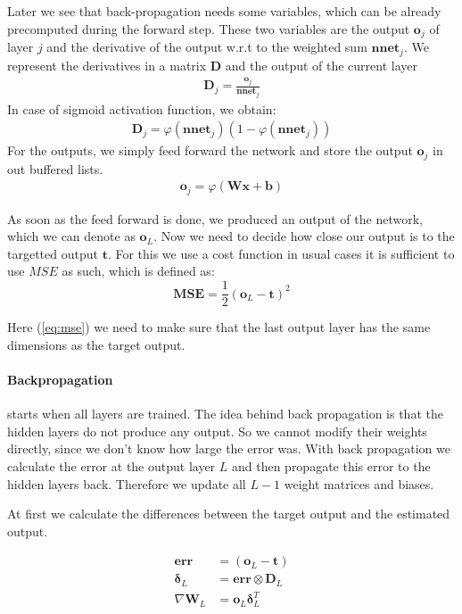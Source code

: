 \documentclass{acm_proc_article-sp}
\begin{document}
Later we see that back-propagation needs some variables, which can be already precomputed during the forward step. These two variables are the output $\mathbf{o}_j$ of layer $j$ and the derivative of the output w.r.t to the weighted sum $\mathbf{nnet}_j$. We represent the derivatives in a matrix $\mathbf{D}$ and the output of the current layer
\begin{align}
\mathbf{D}_j = \frac{\mathbf{o}_j}{\mathbf{nnet}_j}
\end{align}
In case of sigmoid activation function, we obtain:
\begin{align}
\mathbf{D}_j = \varphi \left( \mathbf{nnet}_j \right) \left( 1 - \varphi \left(\mathbf{nnet}_j \right) \right)
\end{align}
For the outputs, we simply feed forward the network and store the output $\mathbf{o}_j$ in out buffered lists.
\begin{align}
\mathbf{o}_j = \varphi \left( \mathbf{Wx+b} \right)
\end{align}

As soon as the feed forward is done, we produced an output of the network, which we can denote as $\mathbf{o}_L$. Now we need to decide how close our output is to the targetted output $\mathbf{t}$. For this we use a cost function in usual cases it is sufficient to use $MSE$ as such, which is defined as:
\begin{equation}
\label{eq:mse}
\mathbf{MSE} = \frac{1}{2} \left( \mathbf{o}_L - \mathbf{t} \right) ^2
\end{equation}

Here (\ref{eq:mse}) we need to make sure that the last output layer has the same dimensions as the target output.


\paragraph{Backpropagation} starts when all layers are trained. The idea behind back propagation is that the hidden layers do not produce any output. So we cannot modify their weights directly, since we don’t know how large the error was. With back propagation we calculate the error at the output layer $L$ and then propagate this error to the hidden layers back. Therefore we update all $L-1$ weight matrices and biases.

At first we calculate the differences between the target output and the estimated output.

\begin{align}
\mathbf{err} &= (\mathbf{o}_L - \mathbf{t})\\
\boldsymbol{\delta}_L &= \mathbf{err} \otimes \mathbf{D}_L\\
\nabla \mathbf{W}_L &= \mathbf{o}_L \boldsymbol{\delta}_L^T
\end{align}
\end{document}
